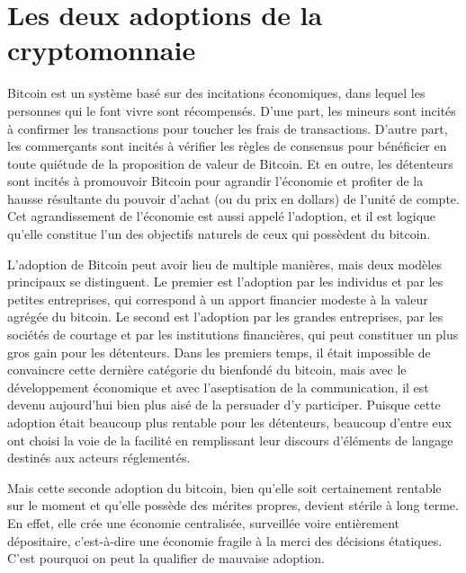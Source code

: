 \section*{Les deux adoptions de la cryptomonnaie}

Bitcoin est un système basé sur des incitations économiques, dans lequel les personnes qui le font vivre sont récompensés. D'une part, les mineurs sont incités à confirmer les transactions pour toucher les frais de transactions. D'autre part, les commerçants sont incités à vérifier les règles de consensus pour bénéficier en toute quiétude de la proposition de valeur de Bitcoin. Et en outre, les détenteurs sont incités à promouvoir Bitcoin pour agrandir l'économie et profiter de la hausse résultante du pouvoir d'achat (ou du prix en dollars) de l'unité de compte. Cet agrandissement de l'économie est aussi appelé l'adoption, et il est logique qu'elle constitue l'un des objectifs naturels de ceux qui possèdent du bitcoin.

L'adoption de Bitcoin peut avoir lieu de multiple manières, mais deux modèles principaux se distinguent. Le premier est l'adoption par les individus et par les petites entreprises, qui correspond à un apport financier modeste à la valeur agrégée du bitcoin. Le second est l'adoption par les grandes entreprises, par les sociétés de courtage et par les institutions financières, qui peut constituer un plus gros gain pour les détenteurs. Dans les premiers temps, il était impossible de convaincre cette dernière catégorie du bienfondé du bitcoin, mais avec le développement économique et avec l'aseptisation de la communication, il est devenu aujourd'hui bien plus aisé de la persuader d'y participer. Puisque cette adoption était beaucoup plus rentable pour les détenteurs, beaucoup d'entre eux ont choisi la voie de la facilité en remplissant leur discours d'éléments de langage destinés aux acteurs réglementés.

Mais cette seconde adoption du bitcoin, bien qu'elle soit certainement rentable sur le moment et qu'elle possède des mérites propres, devient stérile à long terme. En effet, elle crée une économie centralisée, surveillée voire entièrement dépositaire, c'est-à-dire une économie fragile à la merci des décisions étatiques. C'est pourquoi on peut la qualifier de mauvaise adoption.

